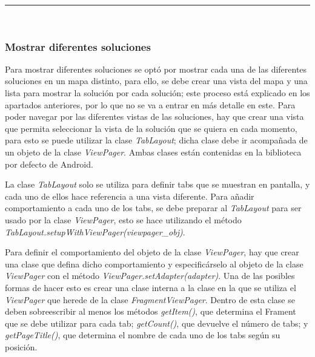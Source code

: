 \noindent\rule[-1ex]{\textwidth}{1pt}\\
\subsubsection{Mostrar diferentes soluciones}
Para mostrar diferentes soluciones se optó por mostrar cada una de las diferentes soluciones en un mapa distinto, para ello, se debe crear una vista del mapa y una lista para mostrar la solución por cada solución; este proceso está explicado en los apartados anteriores, por lo que no se va a entrar en más detalle en este. Para poder navegar por las diferentes vistas de las soluciones, hay que crear una vista que permita seleccionar la vista de la solución que se quiera en cada momento, para esto se puede utilizar la clase \textit{TabLayout}; dicha clase debe ir acompañada de un objeto de la clase \textit{ViewPager}. Ambas clases están contenidas en la biblioteca por defecto de Android.\newline

La clase \textit{TabLayout} solo se utiliza para definir tabs  que se muestran en pantalla, y cada uno de ellos hace referencia a una vista diferente. Para añadir comportamiento a cada uno de los tabs, se debe preparar al \textit{TabLayout} para ser usado por la clase \textit{ViewPager}, esto se hace utilizando el método \textit{TabLayout.setupWithViewPager(viewpager\_obj)}.\newline

Para definir el comportamiento del objeto de la clase \textit{ViewPager}, hay que crear una clase que defina dicho comportamiento y especificárselo al objeto de la clase \textit{ViewPager} con el método \textit{ViewPager.setAdapter(adapter)}. Una de las posibles formas de hacer esto es crear una clase interna a la clase en la que se utiliza el \textit{ViewPager} que herede de la clase \textit{FragmentViewPager}. Dentro de esta clase se deben sobreescribir al menos los métodos \textit{getItem()}, que determina el Frament que se debe utilizar para cada tab; \textit{getCount()}, que devuelve el número de tabs; y \textit{getPageTitle()}, que determina el nombre de cada uno de los tabs según su posición. \newline

